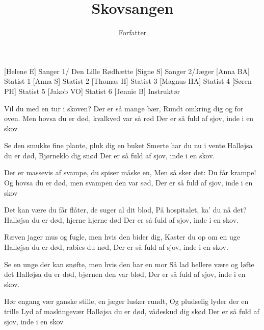 \documentclass[a4paper,11pt]{article}
\title{Skovsangen}
\author{Forfatter}
\begin{document}
\maketitle

\begin{roles}
[Helene E] Sanger 1/ Den Lille Rødhætte
[Signe S] Sanger 2/Jæger 
[Anna BA] Statist 1
[Anna S] Statist 2
[Thomas H] Statist 3
[Magnus HA] Statist 4
[Søren PH] Statist 5
[Jakob VO] Statist 6
[Jennie B] Instruktør
\end{roles}

\begin{song}


 Vil du med en tur i skoven? Der er så mange bær,
Rundt omkring dig og for oven.
Men hovsa du er død, kvalkved var så rød
Der er så fuld af sjov, inde i en skov

Se den smukke fine plante, pluk dig en buket
Smerte har du nu i vente
Halløjsa du er død, Bjørneklo dig snød
Der er så fuld af sjov, inde i en skov.

Der er massevis af svampe, du spiser måske en,
Men så sker det: Du får krampe! 
Og hovsa du er død, men svampen den var sød,
Der er så fuld af sjov, inde i en skov

Det kan være du får flåter, de suger al dit blod,
På hospitalet, ka' du nå det?
Halløjsa du er død, hjerne hjerne død
Der er så fuld af sjov, inde i en skov.

Ræven jager mus og fugle, men hvis den bider dig,
Kaster du op om en uge
Halløjsa du er død, rabies du nød,
Der er så fuld af sjov, inde i en skov.

Se en unge der kan snøfte, men hvis den har en mor
Så lad hellere være og løfte det
Halløjsa du er død, bjørnen den var blød,
Der er så fuld af sjov, inde i en skov.

Hør engang vær ganske stille, en jæger lusker rundt,
Og pludselig lyder der en trille
Lyd af maskingevær
Halløjsa du er død, vådeskud dig skød
Der er så fuld af sjov, inde i en skov

\end{song}
\end{document}
